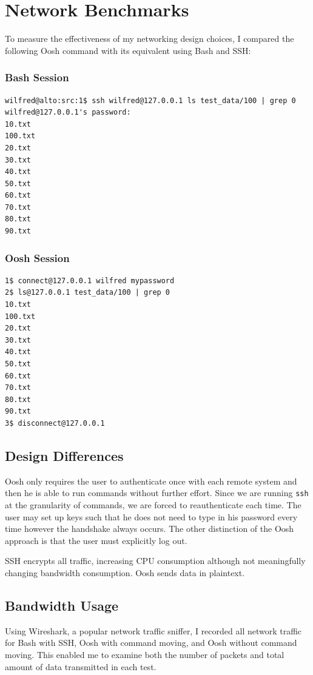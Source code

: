 \documentclass[12pt,twoside,notitlepage]{report}
\begin{document}

\section{Network Benchmarks}

To measure the effectiveness of my networking design choices, I
compared the following Oosh command with its equivalent using Bash and
SSH:

\subsubsection{Bash Session}
\begin{verbatim}
wilfred@alto:src:1$ ssh wilfred@127.0.0.1 ls test_data/100 | grep 0
wilfred@127.0.0.1's password:
10.txt
100.txt
20.txt
30.txt
40.txt
50.txt
60.txt
70.txt
80.txt
90.txt
\end{verbatim}

\subsubsection{Oosh Session}
\begin{verbatim}
1$ connect@127.0.0.1 wilfred mypassword
2$ ls@127.0.0.1 test_data/100 | grep 0
10.txt
100.txt
20.txt
30.txt
40.txt
50.txt
60.txt
70.txt
80.txt
90.txt
3$ disconnect@127.0.0.1
\end{verbatim}

\subsection{Design Differences}
Oosh only requires the user to authenticate once with each remote
system and then he is able to run commands without further
effort. Since we are running {\tt ssh} at the granularity of commands,
we are forced to reauthenticate each time. The user may set up keys
such that he does not need to type in his password every time however
the handshake always occurs. The other distinction of the Oosh
approach is that the user must explicitly log out.

SSH encrypts all traffic, increasing CPU consumption although not
meaningfully changing bandwidth consumption. Oosh sends data in
plaintext.

\subsection{Bandwidth Usage}
Using Wireshark, a popular network traffic sniffer, I recorded all
network traffic for Bash with SSH, Oosh with command moving, and Oosh
without command moving. This enabled me to examine both the number of
packets and total amount of data transmitted in each test.
\end{document}
